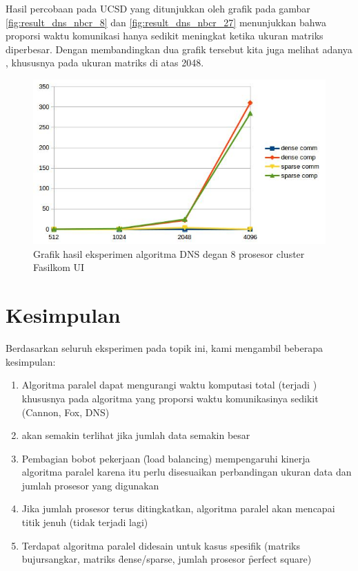 Hasil percobaan pada \cluster UCSD yang ditunjukkan oleh grafik pada gambar \ref{fig:result_dns_nbcr_8} dan \ref{fig:result_dns_nbcr_27} menunjukkan bahwa proporsi waktu komunikasi hanya sedikit meningkat ketika ukuran matriks diperbesar. Dengan membandingkan dua grafik tersebut kita juga melihat adanya \speedup, khususnya pada ukuran matriks di atas 2048.

\begin{figure}
	\centering
	\includegraphics[width=1\textwidth]
	{pics/chart_mm_dns_fasilkom_8}
	\caption{Grafik hasil eksperimen algoritma DNS degan 8 prosesor cluster Fasilkom UI}
	\label{fig:result_dns_fasilkom_8}
\end{figure}  

\section{Kesimpulan}

Berdasarkan seluruh eksperimen pada topik ini, kami mengambil beberapa kesimpulan:

\begin{enumerate}
	\item Algoritma paralel dapat mengurangi waktu komputasi total (terjadi \speedup) khususnya pada algoritma yang proporsi waktu komunikasinya sedikit (Cannon, Fox, DNS)
	\item \Speedup akan semakin terlihat jika jumlah data semakin besar
	\item Pembagian bobot pekerjaan (\f{load balancing}) mempengaruhi kinerja algoritma paralel karena itu perlu disesuaikan perbandingan ukuran data dan jumlah prosesor yang digunakan
	\item Jika jumlah prosesor terus ditingkatkan, algoritma paralel akan mencapai titik jenuh (tidak terjadi \speedup lagi)
	\item Terdapat algoritma paralel didesain untuk kasus spesifik (matriks bujursangkar, matriks \f{dense/sparse}, jumlah prosesor \f{perfect square}) 
\end{enumerate}

